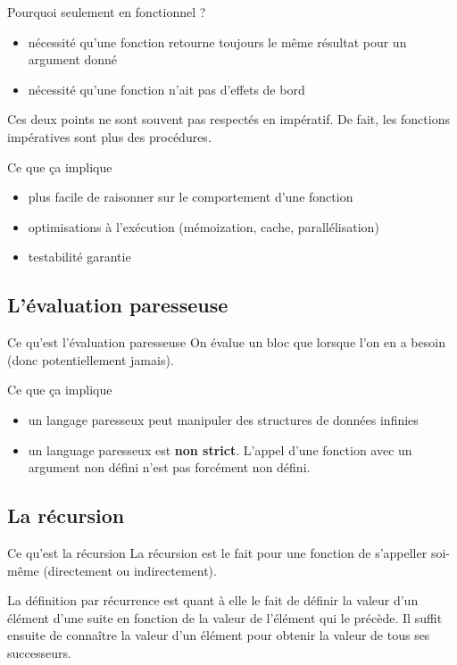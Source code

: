 \documentclass[handout]{beamer}
\begin{document}
  \begin{frame}{Pourquoi seulement en fonctionnel ?}
   \begin{itemize}
    \item nécessité qu'une fonction retourne toujours le même résultat pour un
    argument donné
    \item nécessité qu'une fonction n'ait pas d'effets de bord
   \end{itemize}
   \pause
   Ces deux points ne sont souvent pas respectés en impératif. De fait, les
   fonctions impératives sont plus des procédures.
  \end{frame}


  \begin{frame}{Ce que ça implique}
   \begin{itemize}[<+->]
    \item plus facile de raisonner sur le comportement d'une fonction
    \item optimisations à l'exécution (mémoization, cache, parallélisation)
    \item testabilité garantie
   \end{itemize}
  \end{frame}





 \subsection{L'évaluation paresseuse}
  \begin{frame}{Ce qu'est l'évaluation paresseuse}
   On évalue un bloc que lorsque l'on en a besoin (donc potentiellement jamais).
  \end{frame}


  \begin{frame}{Ce que ça implique}
   \begin{itemize}
    \item un langage paresseux peut manipuler des structures de données infinies
    \item un language paresseux est \textbf{non strict}. L'appel d'une
          fonction avec un argument non défini n'est pas forcément non défini.
   \end{itemize}
  \end{frame}





 \subsection{La récursion}
  \begin{frame}{Ce qu'est la récursion}
   La récursion est le fait pour une fonction de s'appeller soi-même
   (directement ou indirectement).
   
   La définition par récurrence est quant à elle le fait de définir la valeur
   d'un élément d'une suite en fonction de la valeur de l'élément qui le
   précède. Il suffit ensuite de connaître la valeur d'un élément pour obtenir
   la valeur de tous ses successeurs.
  \end{frame}
\end{document}
